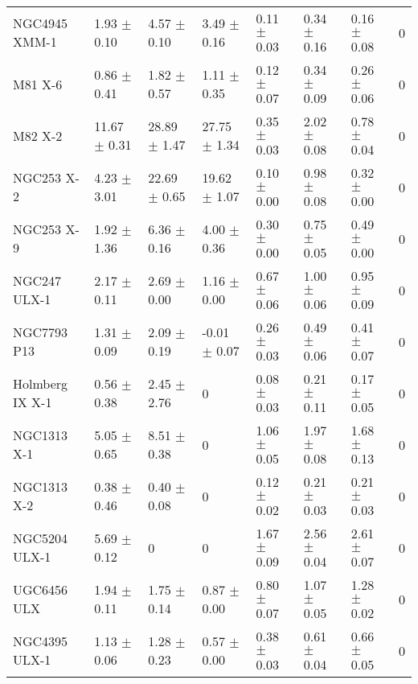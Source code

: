 \begin{tabular}{llllllll}
     NGC4945 XMM-1 &   1.93 $\pm$ 0.10 &   4.57 $\pm$ 0.10 &   3.49 $\pm$ 0.16 &  0.11 $\pm$ 0.03 &   0.34 $\pm$ 0.16 &  0.16 $\pm$ 0.08 &                 0 \\
           M81 X-6 &   0.86 $\pm$ 0.41 &   1.82 $\pm$ 0.57 &   1.11 $\pm$ 0.35 &  0.12 $\pm$ 0.07 &   0.34 $\pm$ 0.09 &  0.26 $\pm$ 0.06 &                 0 \\
           M82 X-2 &  11.67 $\pm$ 0.31 &  28.89 $\pm$ 1.47 &  27.75 $\pm$ 1.34 &  0.35 $\pm$ 0.03 &   2.02 $\pm$ 0.08 &  0.78 $\pm$ 0.04 &                 0 \\
        NGC253 X-2 &   4.23 $\pm$ 3.01 &  22.69 $\pm$ 0.65 &  19.62 $\pm$ 1.07 &  0.10 $\pm$ 0.00 &   0.98 $\pm$ 0.08 &  0.32 $\pm$ 0.00 &                 0 \\
        NGC253 X-9 &   1.92 $\pm$ 1.36 &   6.36 $\pm$ 0.16 &   4.00 $\pm$ 0.36 &  0.30 $\pm$ 0.00 &   0.75 $\pm$ 0.05 &  0.49 $\pm$ 0.00 &                 0 \\
      NGC247 ULX-1 &   2.17 $\pm$ 0.11 &   2.69 $\pm$ 0.00 &   1.16 $\pm$ 0.00 &  0.67 $\pm$ 0.06 &   1.00 $\pm$ 0.06 &  0.95 $\pm$ 0.09 &                 0 \\
       NGC7793 P13 &   1.31 $\pm$ 0.09 &   2.09 $\pm$ 0.19 &  -0.01 $\pm$ 0.07 &  0.26 $\pm$ 0.03 &   0.49 $\pm$ 0.06 &  0.41 $\pm$ 0.07 &                 0 \\
   Holmberg IX X-1 &   0.56 $\pm$ 0.38 &   2.45 $\pm$ 2.76 &                 0 &  0.08 $\pm$ 0.03 &   0.21 $\pm$ 0.11 &  0.17 $\pm$ 0.05 &                 0 \\
       NGC1313 X-1 &   5.05 $\pm$ 0.65 &   8.51 $\pm$ 0.38 &                 0 &  1.06 $\pm$ 0.05 &   1.97 $\pm$ 0.08 &  1.68 $\pm$ 0.13 &                 0 \\
       NGC1313 X-2 &   0.38 $\pm$ 0.46 &   0.40 $\pm$ 0.08 &                 0 &  0.12 $\pm$ 0.02 &   0.21 $\pm$ 0.03 &  0.21 $\pm$ 0.03 &                 0 \\
     NGC5204 ULX-1 &   5.69 $\pm$ 0.12 &                 0 &                 0 &  1.67 $\pm$ 0.09 &   2.56 $\pm$ 0.04 &  2.61 $\pm$ 0.07 &                 0 \\
       UGC6456 ULX &   1.94 $\pm$ 0.11 &   1.75 $\pm$ 0.14 &   0.87 $\pm$ 0.00 &  0.80 $\pm$ 0.07 &   1.07 $\pm$ 0.05 &  1.28 $\pm$ 0.02 &                 0 \\
     NGC4395 ULX-1 &   1.13 $\pm$ 0.06 &   1.28 $\pm$ 0.23 &   0.57 $\pm$ 0.00 &  0.38 $\pm$ 0.03 &   0.61 $\pm$ 0.04 &  0.66 $\pm$ 0.05 &                 0 \\

\end{tabular}
